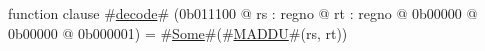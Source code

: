 function clause #\hyperref[zdecode]{decode}# (0b011100 @ rs : regno @ rt : regno @ 0b00000 @ 0b00000 @ 0b000001) =
  #\hyperref[zSome]{Some}#(#\hyperref[zMADDU]{MADDU}#(rs, rt))
